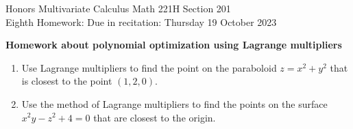 \documentclass[12pt]{article}
\begin{document}
\LARGE 
\noindent
{\color{Maroon}Honors Multivariate Calculus \hfill Math 221H Section 201}\vspace{2pt}\\
\large
Eighth Homework:\hfill 
Due in recitation: Thursday 19 October 2023\vspace{2pt}

\normalsize
    {\bf {\color{Maroon}Homework about polynomial optimization using Lagrange multipliers}}\vspace{2pt}

\begin{enumerate}



\item Use Lagrange multipliers to find the point on the paraboloid $z=x^2+y^2$ that is closest to the point $(1,2,0)$.
\vspace{-2pt}
   
\item Use the method of Lagrange multipliers to find the points on the surface $x^2y-z^2+4=0$ that are closest to the origin.
\vspace{-2pt}


\end{enumerate}
\end{document}
